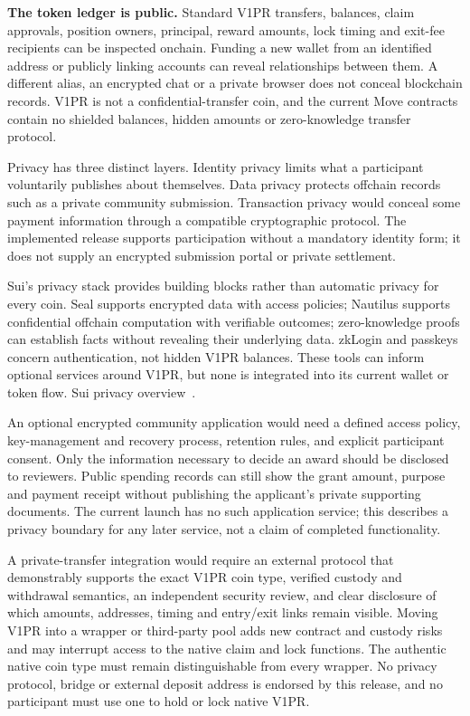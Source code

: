 \documentclass[11pt]{article}
\begin{document}
\textbf{The token ledger is public.} Standard V1PR transfers, balances, claim approvals, position owners, principal, reward amounts, lock timing and exit-fee recipients can be inspected onchain. Funding a new wallet from an identified address or publicly linking accounts can reveal relationships between them. A different alias, an encrypted chat or a private browser does not conceal blockchain records. V1PR is not a confidential-transfer coin, and the current Move contracts contain no shielded balances, hidden amounts or zero-knowledge transfer protocol.

Privacy has three distinct layers. Identity privacy limits what a participant voluntarily publishes about themselves. Data privacy protects offchain records such as a private community submission. Transaction privacy would conceal some payment information through a compatible cryptographic protocol. The implemented release supports participation without a mandatory identity form; it does not supply an encrypted submission portal or private settlement.

Sui's privacy stack provides building blocks rather than automatic privacy for every coin. Seal supports encrypted data with access policies; Nautilus supports confidential offchain computation with verifiable outcomes; zero-knowledge proofs can establish facts without revealing their underlying data. zkLogin and passkeys concern authentication, not hidden V1PR balances. These tools can inform optional services around V1PR, but none is integrated into its current wallet or token flow. Sui privacy overview~\cite{ref5}.

An optional encrypted community application would need a defined access policy, key-management and recovery process, retention rules, and explicit participant consent. Only the information necessary to decide an award should be disclosed to reviewers. Public spending records can still show the grant amount, purpose and payment receipt without publishing the applicant's private supporting documents. The current launch has no such application service; this describes a privacy boundary for any later service, not a claim of completed functionality.

A private-transfer integration would require an external protocol that demonstrably supports the exact V1PR coin type, verified custody and withdrawal semantics, an independent security review, and clear disclosure of which amounts, addresses, timing and entry/exit links remain visible. Moving V1PR into a wrapper or third-party pool adds new contract and custody risks and may interrupt access to the native claim and lock functions. The authentic native coin type must remain distinguishable from every wrapper. No privacy protocol, bridge or external deposit address is endorsed by this release, and no participant must use one to hold or lock native V1PR.
\end{document}
